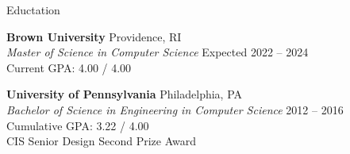 \documentclass{resume} %
\begin{document}

\begin{grouping}{Eductation}
\item {\bf Brown University} \hfill Providence, RI \\
    {\em Master of Science in Computer Science} \hfill Expected 2022 -- 2024 \\
    Current GPA: 4.00 / 4.00

\item {\bf University of Pennsylvania} \hfill Philadelphia, PA \\
    {\em Bachelor of Science in Engineering in Computer Science} \hfill 2012 -- 2016 \\
    Cumulative GPA: 3.22 / 4.00 \\
    CIS Senior Design Second Prize Award
\end{grouping}

\iffalse
\hspace*{1mm}{\em Relevant Courses:} Advanced Topics in Algorithms and Complexity \\
\hspace*{2mm}Internet \& Web Systems, Computer Operating Systems, Introduction to Artificial Intelligence

\hspace*{1mm} {\bf Belmont High School} \hfill Belmont, MA \\
\hspace*{1mm} Graduate \hfill June 2012 \\
\hspace*{1mm} Cumulative GPA: 3.84 / 4.00
\fi

\end{document}

